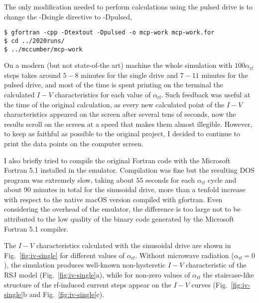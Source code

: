 The only modification needed to perform calculations using the pulsed drive is to change the \textsf{-Dsingle} directive to \textsf{-Dpulsed},

\begin{lstlisting}
$ gfortran -cpp -Dtextout -Dpulsed -o mcp-work mcp-work.for
$ cd ../2020runs/
$ ../mccumber/mcp-work
\end{lstlisting}


On a modern (but not state-of-the art) machine the whole simulation with $100 \alpha_\mathrm{rf}$ steps takes around $5 - 8$ minutes for the single drive and $7 -11$ minutes for the pulsed drive, and most of the time is spent printing on the terminal the calculated $I - V$ characteristics for each value of $\alpha_\mathrm{rf}$. Such feedback was useful at the time of the original calculation, as every new calculated point of the $I - V$ characteristics appeared on the screen after several tens of seconds, now the results scroll on the screen at a speed that makes them almost illegible.
However, to keep as faithful as possible to the original project, I decided to continue to print the data points on the computer screen.

I also briefly tried to compile the original Fortran code with the Microsoft Fortran 5.1 installed in the emulator. Compilation was fine but the resulting DOS program was extremely slow, taking about $55$ seconds for each $\alpha_\mathrm{rf}$ cycle and about $90$ minutes in total for the sinusoidal drive, more than a tenfold increase with respect to the native macOS version compiled with gfortran.
Even considering the overhead of the emulator, the difference is too large not to be attributed to the low quality of the binary code generated by the Microsoft Fortran 5.1 compiler.

The $I - V$ characteristics calculated with the sinusoidal drive are shown in Fig.~\ref{fig:iv-single} for different values of $\alpha_\mathrm{rf}$.
Without microwave radiation ($\alpha_\mathrm{rf} = 0$), the simulation produces well-known non-hysteretic $I - V$ characteristic of the RSJ model (Fig.~\ref{fig:iv-single}a), while for non-zero values of $\alpha_\mathrm{rf}$ the staircase-like structure of the rf-induced current steps appear on the $I - V$ curves (Fig.~\ref{fig:iv-single}b and Fig.~\ref{fig:iv-single}c).

